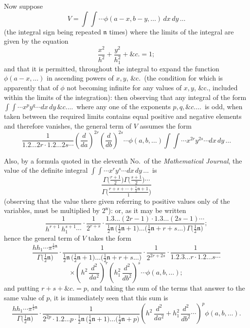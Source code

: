 \documentclass[11pt]{article}
\begin{document}
Now suppose
\[
V = \int\!\!\int \cdots \phi(a - x, b - y, \ldots)\,dx\,dy\,\ldots
\]
(the integral sign being repeated $\mathfrak{n}$ times) where the limits of the integral are given by the equation
\[
\frac{x^2}{h^2} + \frac{y^2}{h_1^2} + \&c. = 1;
\]
and that it is permitted, throughout the integral to expand the function $\phi(a - x, \ldots)$ in ascending powers of $x, y$, \&c.\ (the condition for which is apparently that of $\phi$ not becoming infinite for any values of $x, y$, \&c., included within the limits of the integration): then observing that any integral of the form $\int\!\!\int \cdots x^{p}y^{q}\cdots dx\,dy\,\&c.\ldots$\ where any one of the exponents $p, q, \&c.\ldots$\ is odd, when taken between the required limits contains equal positive and negative elements and therefore vanishes, the general term of $V$ assumes the form
\[
\frac{1}{1.2\ldots 2r\cdot 1.2\ldots 2s\cdots}
\left(\frac{d}{da}\right)^{2r}\left(\frac{d}{db}\right)^{2s}\cdots \phi(a, b, \ldots)\int\!\!\int \cdots x^{2r}y^{2s}\cdots dx\,dy\,\ldots
\]

Also, by a formula quoted in the eleventh No.\ of the \textit{Mathematical Journal}, the value of the definite integral $\int\!\!\int \cdots x^{r}y^{s}\cdots dx\,dy\,\ldots$\ is
\[
\frac{\Gamma\bigl(\tfrac{r+1}{2}\bigr)\Gamma\bigl(\tfrac{s+1}{2}\bigr)\cdots}{\Gamma\bigl(\tfrac{r+s+\cdots+\tfrac{1}{2}\mathfrak{n}+1}{1}\bigr)}
\]
(observing that the value there given referring to positive values only of the variables, must be multiplied by $2^{\mathfrak{n}}$): or, as it may be written
\[
\frac{1}{h^{r+1}\,h_{1}^{s+1}\cdots}\cdot\frac{1}{2^{r+s}}\cdot\frac{1.3\ldots(2r-1)\cdot 1.3\ldots(2s-1)\cdots}{\tfrac{1}{2}\mathfrak{n}\,\bigl(\tfrac{1}{2}\mathfrak{n} + 1\bigr)\ldots\bigl(\tfrac{1}{2}\mathfrak{n} + r + s\ldots\bigr)\,\Gamma\bigl(\tfrac{1}{2}\mathfrak{n}\bigr)};
\]
hence the general term of $V$ takes the form
\[
\frac{hh_{1}\cdots\pi^{\frac{1}{2}\mathfrak{n}}}{\Gamma\bigl(\tfrac{1}{2}\mathfrak{n}\bigr)}\cdot\frac{1}{\tfrac{1}{2}\mathfrak{n}\,\bigl(\tfrac{1}{2}\mathfrak{n} + 1\bigr)\ldots\bigl(\tfrac{1}{2}\mathfrak{n} + r + s\ldots\bigr)}\cdot\frac{1}{2^{2r+2s}}\cdot\frac{1}{1.2.3\ldots r\cdot 1.2\ldots s\cdots}
\]
\[
\times \left(h^{2}\,\frac{d^{2}}{da^{2}}\right)^{r}\left(h_{1}^{2}\,\frac{d^{2}}{db^{2}}\right)^{s}\cdots\phi(a, b, \ldots);
\]
and putting $r + s + \&c. = p$, and taking the sum of the terms that answer to the same value of $p$, it is immediately seen that this sum is
\[
\frac{hh_{1}\cdots\pi^{\frac{1}{2}\mathfrak{n}}}{\Gamma\bigl(\tfrac{1}{2}\mathfrak{n}\bigr)}\cdot\frac{1}{2^{2p}\cdot 1.2\ldots p\cdot\tfrac{1}{2}\mathfrak{n}\,\bigl(\tfrac{1}{2}\mathfrak{n} + 1\bigr)\ldots\bigl(\tfrac{1}{2}\mathfrak{n} + p\bigr)}\left(h^{2}\,\frac{d^{2}}{da^{2}} + h_{1}^{2}\,\frac{d^{2}}{db^{2}}\cdots\right)^{p}\phi(a, b, \ldots).
\]
\end{document}
